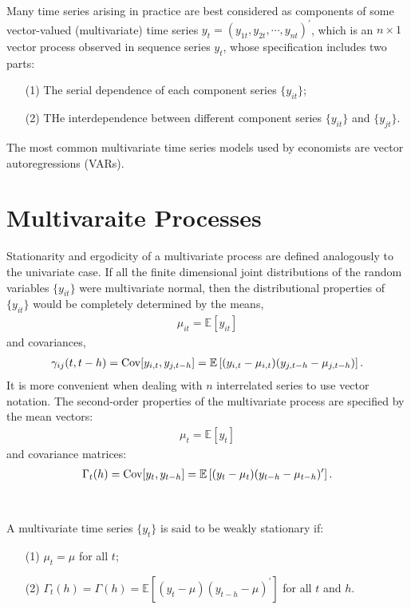 Many time series arising in practice are best considered as components of
some vector-valued (multivariate) time series $y_t = (y_{1t}, y_{2t}, \cdots, y_{nt})^{\prime}$,
which is an $n \times 1$ vector process observed in sequence series $y_t$,
whose specification includes two parts:
\begin{enumerate}
    \item[(1)] The serial dependence of each component series $\{y_{it}\}$;
    \item[(2)] THe interdependence between different component series $\{y_{it}\}$ and $\{y_{jt}\}$.
\end{enumerate}
The most common multivariate time series models used by economists are vector autoregressions (VARs).

\section{Multivaraite Processes}
Stationarity and ergodicity of a multivariate process are defined analogously to the univariate case.
If all the finite dimensional joint distributions of the random variables $\{y_{it}\}$ were multivariate normal,
then the distributional properties of $\{y_{it}\}$ would be completely determined by the means,
\begin{gather*}
    \mu_{it} = \mathbb{E}[y_{it}]
\end{gather*}
and covariances,
\begin{gather*}
    \gamma_{ij}(t, t-h) = \operatorname{Cov}[y_{i,t}, y_{j,t-h}] = \mathbb{E}\left[ (y_{i,t} - \mu_{i,t})(y_{j,t-h} - \mu_{j,t-h}) \right].
\end{gather*}
It is more convenient when dealing with $n$ interrelated series to use vector notation. 
The second-order properties of the multivariate process are specified by the mean vectors:
\begin{gather*}
    \mu_t = \mathbb{E}[y_t]
\end{gather*}
and covariance matrices:
\begin{gather*}
    \Gamma_t(h) = \operatorname{Cov}[y_t, y_{t-h}] = \mathbb{E}\left[ (y_t - \mu_t)(y_{t-h} - \mu_{t-h})^{\prime} \right].
\end{gather*}
\begin{definition}\label{def:stationary-multivariate}
    \

    A multivariate time series $\{y_t\}$ is said to be weakly stationary if:
    \begin{enumerate}
        \item[(1)] $\mu_t = \mu$ for all $t$;
        \item[(2)] $\Gamma_t(h) = \Gamma(h) = \mathbb{E}\left[(y_t - \mu)(y_{t-h} - \mu)^{\prime}\right]$ for all $t$ and $h$.
    \end{enumerate}
\end{definition}
